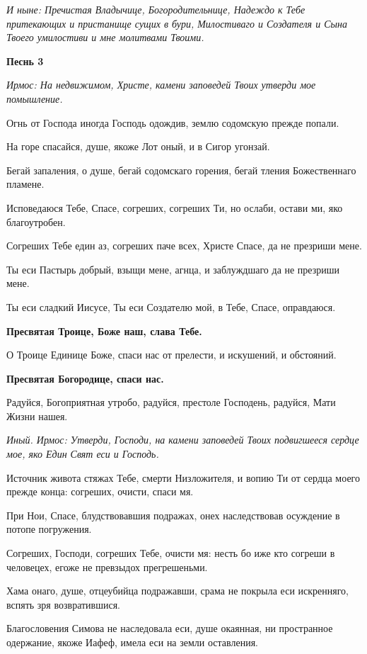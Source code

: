 \itshape И ныне\normalfont{}: Пречистая Владычице, Богородительнице, Надеждо к Тебе притекающих и пристанище сущих в бури, Милостиваго и Создателя и Сына Твоего умилостиви и мне молитвами Твоими. 

\medskip
\bfseries Песнь 3\normalfont{}


\itshape Ирмос\normalfont{}: На недвижимом, Христе, камени заповедей Твоих утверди мое помышление.


Огнь от Господа иногда Господь одождив, землю содомскую прежде попали.


На горе спасайся, душе, якоже Лот оный, и в Сигор угонзай.


Бегай запаления, о душе, бегай содомскаго горения, бегай тления Божественнаго пламене.


Исповедаюся Тебе, Спасе, согреших, согреших Ти, но ослаби, остави ми, яко благоутробен.


Согреших Тебе един аз, согреших паче всех, Христе Спасе, да не презриши мене.


Ты еси Пастырь добрый, взыщи мене, агнца, и заблуждшаго да не презриши мене.

Ты еси сладкий Иисусе, Ты еси Создателю мой, в Тебе, Спасе, оправдаюся.


\bfseries Пресвятая Троице, Боже наш, слава Тебе.\normalfont{}


О Троице Единице Боже, спаси нас от прелести, и искушений, и обстояний.

\bfseries Пресвятая Богородице, спаси нас.\normalfont{}


Радуйся, Богоприятная утробо, радуйся, престоле Господень, радуйся, Мати Жизни нашея.


\itshape Иный. Ирмос\normalfont{}: Утверди, Господи, на камени заповедей Твоих подвигшееся сердце мое, яко Един Свят еси и Господь.


Источник живота стяжах Тебе, смерти Низложителя, и вопию Ти от сердца моего прежде конца: согреших, очисти, спаси мя.


При Нои, Спасе, блудствовавшия подражах, онех наследствовав осуждение в потопе погружения.


Согреших, Господи, согреших Тебе, очисти мя: несть бо иже кто согреши в человецех, егоже не превзыдох прегрешеньми.


Хама онаго, душе, отцеубийца подражавши, срама не покрыла еси искренняго, вспять зря возвратившися.


Благословения Симова не наследовала еси, душе окаянная, ни пространное одержание, якоже Иафеф, имела еси на земли оставления.


